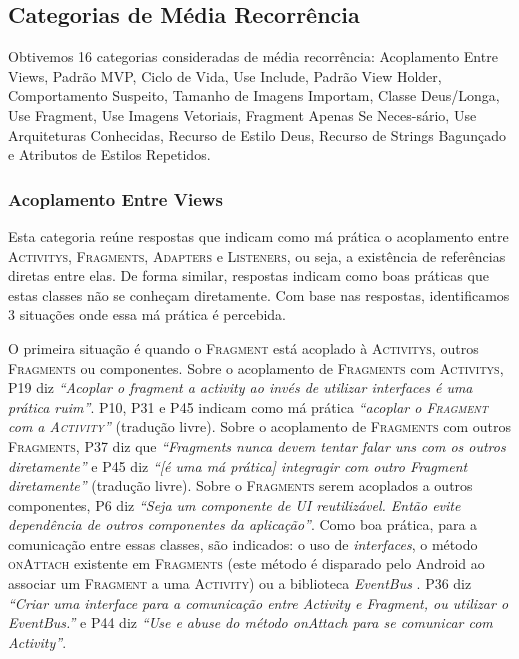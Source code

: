 \subsection{Categorias de M\'edia Recorr\^encia}
Obtivemos 16 categorias consideradas de m\'edia recorr\^encia: Acoplamento Entre Views, Padr\~ao MVP, Ciclo de Vida, Use Include, Padr\~ao View Holder, Comportamento Suspeito, Tamanho de Imagens Importam, Classe Deus/Longa, Use Fragment, Use Imagens Vetoriais, Fragment Apenas Se Neces-s\'ario, Use Arquiteturas Conhecidas, Recurso de Estilo Deus, Recurso de Strings Bagun\c{c}ado e Atributos de Estilos Repetidos.

\subsubsection{Acoplamento Entre Views}
Esta categoria re\'une respostas que indicam como m\'a pr\'atica o acoplamento entre \textsc{Activitys}, \textsc{Fragments}, \textsc{Adapters} e \textsc{Listeners}, ou seja, a exist\^encia de refer\^encias diretas entre elas. De forma similar, respostas indicam como boas pr\'aticas que estas classes n\~ao se conhe\c{c}am diretamente. Com base nas respostas, identificamos 3 situa\c{c}\~oes onde essa m\'a pr\'atica \'e percebida.

O primeira situa\c{c}\~ao \'e quando o \textsc{Fragment} est\'a acoplado \`a \textsc{Activitys}, outros \textsc{Fragments} ou componentes. Sobre o acoplamento de \textsc{Fragments} com \textsc{Activitys}, P19 diz \textit{``Acoplar o fragment a activity ao inv\'es de utilizar interfaces \'e uma pr\'atica ruim''}. P10, P31 e P45 indicam como m\'a pr\'atica \textit{``acoplar o \textsc{Fragment} com a \textsc{Activity}''} (tradu\c{c}\~ao livre). Sobre o acoplamento de \textsc{Fragments} com outros \textsc{Fragments}, P37 diz que \textit{``Fragments nunca devem tentar falar uns com os outros diretamente''} e P45 diz \textit{``[\'e uma m\'a pr\'atica] integragir com outro Fragment diretamente''} (tradu\c{c}\~ao livre). Sobre o \textsc{Fragments} serem acoplados a outros componentes, P6 diz \textit{``Seja um componente de UI reutiliz\'avel. Ent\~ao evite depend\^encia de outros componentes da aplica\c{c}\~ao''}. Como boa pr\'atica, para a comunica\c{c}\~ao entre essas classes, s\~ao indicados: o uso de \textit{interfaces}, o m\'etodo \textsc{onAttach} existente em \textsc{Fragments} (este m\'etodo \'e disparado pelo Android ao associar um \textsc{Fragment} a uma \textsc{Activity}) ou a biblioteca \textit{EventBus} \cite{EventBusAndroid}. P36 diz \textit{``Criar uma interface para a comunica\c{c}\~ao entre Activity e Fragment, ou utilizar o EventBus.''} e P44 diz \textit{``Use e abuse do m\'etodo onAttach para se comunicar com Activity''}. 

